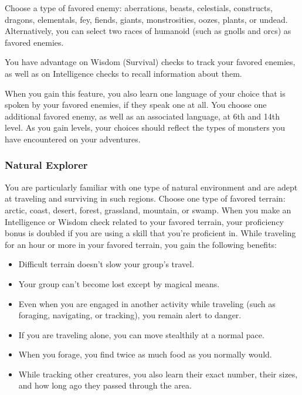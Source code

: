 \documentclass[
]{article}
\providecommand{\tightlist}{%
  \setlength{\itemsep}{0pt}\setlength{\parskip}{0pt}}
\begin{document}
Choose a type of favored enemy: aberrations, beasts, celestials,
constructs, dragons, elementals, fey, fiends, giants, monstrosities,
oozes, plants, or undead. Alternatively, you can select two races of
humanoid (such as gnolls and orcs) as favored enemies.

You have advantage on Wisdom (Survival) checks to track your favored
enemies, as well as on Intelligence checks to recall information about
them.

When you gain this feature, you also learn one language of your choice
that is spoken by your favored enemies, if they speak one at all. You
choose one additional favored enemy, as well as an associated language,
at 6th and 14th level. As you gain levels, your choices should reflect
the types of monsters you have encountered on your adventures.

\hypertarget{natural-explorer}{%
\subsubsection{Natural Explorer}\label{natural-explorer}}

You are particularly familiar with one type of natural environment and
are adept at traveling and surviving in such regions. Choose one type of
favored terrain: arctic, coast, desert, forest, grassland, mountain, or
swamp. When you make an Intelligence or Wisdom check related to your
favored terrain, your proficiency bonus is doubled if you are using a
skill that you're proficient in. While traveling for an hour or more in
your favored terrain, you gain the following benefits:

\begin{itemize}
\tightlist
\item
  Difficult terrain doesn't slow your group's travel.
\item
  Your group can't become lost except by magical means.
\item
  Even when you are engaged in another activity while traveling (such as
  foraging, navigating, or tracking), you remain alert to danger.
\item
  If you are traveling alone, you can move stealthily at a normal pace.
\item
  When you forage, you find twice as much food as you normally would.
\item
  While tracking other creatures, you also learn their exact number,
  their sizes, and how long ago they passed through the area.
\end{itemize}
\end{document}
